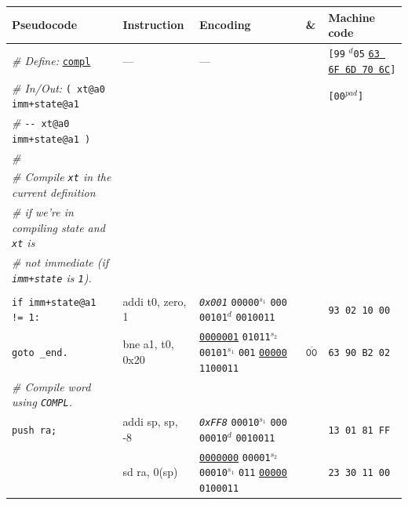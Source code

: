 \documentclass[a4paper,12pt,final]{article}
\begin{document}
\begin{table}[!htbp] \begin{adjustwidth}{-1cm}{-1cm} \fontsize{8}{9.600000}\selectfont
\begin{center}
\begin{tabular}{l|ll|l|l}
\textbf{Pseudocode} & \textbf{Instruction} & \textbf{Encoding} & \textbf{\&} & \textbf{Machine code}\\[0pt]
\hline
\emph{\# Define:} \uline{\texttt{compl}} & --- & --- &  & \texttt{[99} \(^{d}\)​\texttt{05} \uline{\texttt{63 6F 6D 70 6C}}​\texttt{]}\\[0pt]
\emph{\# In/Out:}    \texttt{( xt@a0 imm+state@a1} &  &  &  & \texttt{[00}​\(^{pad}\)​\texttt{]}\\[0pt]
\emph{\#}\hspace{3.35em} \texttt{-{}-{} xt@a0 imm+state@a1 )} &  &  &  & \\[0pt]
\emph{\#} &  &  &  & \\[0pt]
\emph{\# Compile \texttt{xt} in the current definition} &  &  &  & \\[0pt]
\emph{\# if we're in compiling state and \texttt{xt} is} &  &  &  & \\[0pt]
\emph{\# not immediate (if \texttt{imm+state} is \texttt{1}).} &  &  &  & \\[0pt]
 &  &  &  & \\[0pt]
\hspace{1.053000em} \texttt{if imm+state@a1 != 1:} & addi t0, zero, 1 & \emph{\texttt{0x001}}                    \texttt{00000}​\(^{s_{1}}\) \texttt{000} \texttt{00101}​\(^{d}\)  \texttt{0010011} &  & \texttt{93 02 10 00}\\[0pt]
\hspace{2.106000em}   \texttt{goto \_end.} & bne a1, t0, 0x20 & \uline{\texttt{0000001}} \texttt{01011}​\(^{s_{2}}\) \texttt{00101}​\(^{s_{1}}\) \texttt{001} \uline{\texttt{00000}} \texttt{1100011} & \(\overline{\texttt{00}}\) & \texttt{63 90 B2 02}\\[0pt]
\hspace{1.053000em} \emph{\# Compile word using \texttt{COMPL}.} &  &  &  & \\[0pt]
\hspace{1.053000em} \texttt{push ra;} & addi sp, sp, -8 & \emph{\texttt{0xFF8}}                    \texttt{00010}​\(^{s_{1}}\) \texttt{000} \texttt{00010}​\(^{d}\)  \texttt{0010011} &  & \texttt{13 01 81 FF}\\[0pt]
\hspace{1.053000em} & sd ra, 0(sp) & \uline{\texttt{0000000}} \texttt{00001}​\(^{s_{2}}\) \texttt{00010}​\(^{s_{1}}\) \texttt{011} \uline{\texttt{00000}} \texttt{0100011} &  & \texttt{23 30 11 00}\\[0pt]

\end{tabular}
\end{center}
\end{adjustwidth}
\end{table}
\end{document}
